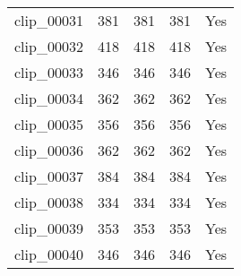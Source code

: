 \begin{table}
\begin{tabular}{lrrrl}
clip_00031 & 381 & 381 & 381 & Yes \\
clip_00032 & 418 & 418 & 418 & Yes \\
clip_00033 & 346 & 346 & 346 & Yes \\
clip_00034 & 362 & 362 & 362 & Yes \\
clip_00035 & 356 & 356 & 356 & Yes \\
clip_00036 & 362 & 362 & 362 & Yes \\
clip_00037 & 384 & 384 & 384 & Yes \\
clip_00038 & 334 & 334 & 334 & Yes \\
clip_00039 & 353 & 353 & 353 & Yes \\
clip_00040 & 346 & 346 & 346 & Yes \\
\bottomrule
\end{tabular}
\end{table}
